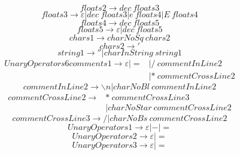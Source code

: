 \documentclass{article}
\begin{document}
\begin{equation}
	floats2 \rightarrow dec \ floats3
\end{equation}
\begin{equation}
	floats3 \rightarrow \varepsilon | dec \ floats3 | e \ floats4 | E \ floats4
\end{equation}
\begin{equation}
	floats4 \rightarrow dec \ floats5
\end{equation}
\begin{equation}
	floats5 \rightarrow \varepsilon | dec \ floats5
\end{equation}
\begin{equation}
	chars1 \rightarrow charNoSq \ chars2
\end{equation}
\begin{equation}
	chars2 \rightarrow '
\end{equation}
\begin{equation}
	string1 \rightarrow '' | charInString \ string1
\end{equation}
\begin{equation}
	\begin{aligned}
		UnaryOperators6comments1 \rightarrow \varepsilon | = & | / \ commentInLine2   \\
		                                                     & |* \ commentCrossLine2
	\end{aligned}
\end{equation}
\begin{equation}
	commentInLine2 \rightarrow \backslash n | charNoBl \ commentInLine2
\end{equation}
\begin{equation}
	\begin{aligned}
		commentCrossLine2 \rightarrow & * \ commentCrossLine3            \\
		                              & | charNoStar \ commentCrossLine2
	\end{aligned}
\end{equation}
\begin{equation}
	commentCrossLine3 \rightarrow / | charNoBs \ commentCrossLine2
\end{equation}
\begin{equation}
	UnaryOperators1 \rightarrow \varepsilon | - | =
\end{equation}
\begin{equation}
	UnaryOperators2 \rightarrow \varepsilon | =
\end{equation}
\begin{equation}
	UnaryOperators3 \rightarrow \varepsilon | =
\end{equation}
\end{document}
